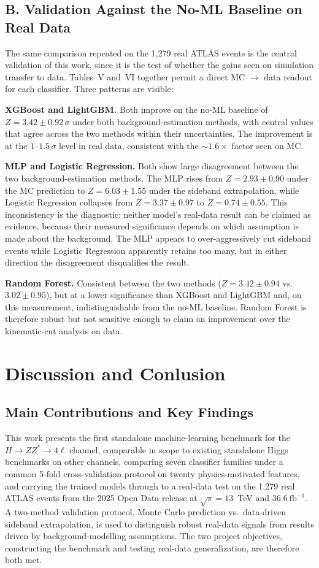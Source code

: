 \documentclass[conference]{IEEEtran}
\begin{document}
{\subsection*{B. Validation Against the No-ML Baseline on Real Data}

The same comparison repeated on the 1,279 real ATLAS events is the central validation of this work, since it is the test of whether the gains seen on simulation transfer to data. Tables~V and~VI together permit a direct MC $\to$ data readout for each classifier. Three patterns are visible:

\textbf{XGBoost and LightGBM.} Both improve on the no-ML baseline of $Z = 3.42 \pm 0.92\,\sigma$ under both background-estimation methods, with central values that agree across the two methods within their uncertainties. The improvement is at the $1$--$1.5\,\sigma$ level in real data, consistent with the $\sim 1.6\times$ factor seen on MC.

\textbf{MLP and Logistic Regression.} Both show large disagreement between the two background-estimation methods. The MLP rises from $Z = 2.93 \pm 0.90$ under the MC prediction to $Z = 6.03 \pm 1.55$ under the sideband extrapolation, while Logistic Regression collapses from $Z = 3.37 \pm 0.97$ to $Z = 0.74 \pm 0.55$. This inconsistency is the diagnostic: neither model's real-data result can be claimed as evidence, because their measured significance depends on which assumption is made about the background. The MLP appears to over-aggressively cut sideband events while Logistic Regression apparently retains too many, but in either direction the disagreement disqualifies the result.

\textbf{Random Forest.} Consistent between the two methods ($Z = 3.42 \pm 0.94$ vs.\ $3.02 \pm 0.95$), but at a lower significance than XGBoost and LightGBM and, on this measurement, indistinguishable from the no-ML baseline. Random Forest is therefore robust but not sensitive enough to claim an improvement over the kinematic-cut analysis on data.


\section*{Discussion and Conlusion}
\subsection{Main Contributions and Key Findings}
This work presents the first standalone machine-learning benchmark for the $H \to ZZ^* \to 4\ell$ channel, comparable in scope to existing standalone Higgs benchmarks on other channels, comparing seven classifier families under a common 5-fold cross-validation protocol on twenty physics-motivated features, and carrying the trained models through to a real-data test on the 1,279 real ATLAS events from the 2025 Open Data release at $\sqrt{s} = 13$~TeV and $36.6~\mathrm{fb}^{-1}$. A two-method validation protocol, Monte Carlo prediction vs.\ data-driven sideband extrapolation, is used to distinguish robust real-data signals from results driven by background-modelling assumptions. The two project objectives, constructing the benchmark and testing real-data generalization, are therefore both met.

}
\end{document}
